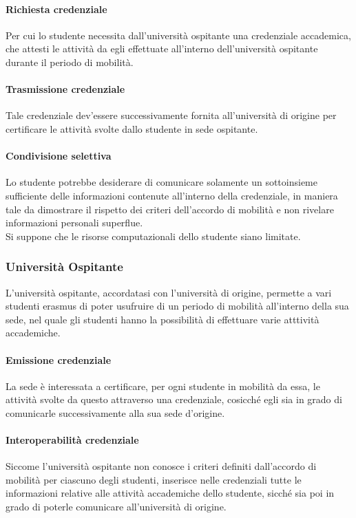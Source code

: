 \documentclass[a4paper,12pt]{article}
\begin{document}
\paragraph{Richiesta credenziale} Per cui lo studente necessita dall'università ospitante una credenziale accademica, che attesti le attività da egli effettuate all'interno dell'università ospitante durante il periodo di mobilità.
\paragraph{Trasmissione credenziale}Tale credenziale dev'essere successivamente fornita all'università di origine per certificare le attività svolte dallo studente in sede ospitante. 
\paragraph{Condivisione selettiva} Lo studente potrebbe desiderare di comunicare solamente un sottoinsieme sufficiente delle informazioni contenute all'interno della credenziale, in maniera tale da dimostrare il rispetto dei criteri dell'accordo di mobilità e non rivelare informazioni personali superflue.
\\[0.5em] Si suppone che le risorse computazionali dello studente siano limitate. 

\subsubsection{Università Ospitante}
L'università ospitante, accordatasi con l'università di origine, permette a vari studenti erasmus di poter usufruire di un periodo di mobilità all'interno della sua sede, nel quale gli studenti hanno la possibilità di effettuare varie atttività accademiche.
\paragraph{Emissione credenziale} La sede è interessata a certificare, per ogni studente in mobilità da essa, le attività svolte da questo attraverso una credenziale, cosicché egli sia in grado di comunicarle successivamente alla sua sede d'origine.
\paragraph{Interoperabilità credenziale} Siccome l'università ospitante non conosce i criteri definiti dall'accordo di mobilità per ciascuno degli studenti, inserisce nelle credenziali tutte le informazioni relative alle attività accademiche dello studente, sicché sia poi in grado di poterle comunicare all'università di origine.
\end{document}
